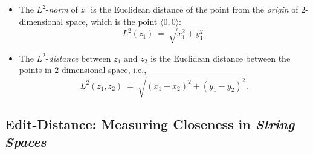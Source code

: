 \medskip

 
\begin{itemize}
\item
The $L^2$-{\it norm}  of $z_1$ is the
Euclidean distance of the point from the {\it origin} of
$2$-dimensional space, 
which is the point $\langle 0,0 \rangle$:
\[ L^2(z_1) \ = \ \sqrt{x_1^2 + y_1^2}.  \]  

\item
The $L^2$-{\it distance}  between $z_1$
and $z_2$ is the Euclidean distance between the points in
$2$-dimensional space, i.e.,
\[ L^2(z_1, z_2) \ = \ \sqrt{(x_1 - x_2)^2 + (y_1 - y_2)^2}. \]
\end{itemize}


\subsection{Edit-Distance: Measuring Closeness in {\em String Spaces}}

